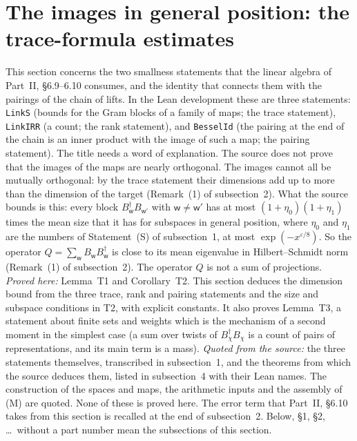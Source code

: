 \documentclass[11pt,letterpaper]{article}
\begin{document}
\section{The images in general position: the trace-formula estimates}\label{tr:sec}

This section concerns the two smallness statements that the linear algebra of Part~II, \S6.9--6.10 consumes,
and the identity that connects them with the pairings of the chain of lifts. In the Lean development these
are three statements: \texttt{LinkS} (bounds for the Gram blocks of a family of maps; the trace statement),
\texttt{LinkIRR} (a count; the rank statement), and \texttt{BesselId} (the pairing at the end of the chain is
an inner product with the image of such a map; the pairing statement). The title needs a word of
explanation. The source does not prove that the images of the maps are nearly orthogonal. The images cannot
all be mutually orthogonal: by the trace statement their dimensions add up to more than the dimension of the
target (Remark~(1) of subsection~2). What the source bounds is this: every block
$B_{\mathsf w}^\dagger B_{\mathsf w'}$ with $\mathsf w\ne\mathsf w'$ has at most $(1+\eta_0)(1+\eta_1)$ times
the mean size that it has for subspaces in general position, where $\eta_0$ and $\eta_1$ are the numbers
of Statement~(S) of subsection~1, at most $\exp(-x^{\varepsilon/8})$. So the operator
$Q=\sum_{\mathsf w}B_{\mathsf w}B_{\mathsf w}^\dagger$ is close to its mean eigenvalue in Hilbert--Schmidt norm
(Remark~(1) of subsection~2). The operator $Q$ is not a sum of projections. \emph{Proved here:} Lemma~T1 and
Corollary~T2. This section deduces the dimension bound from the three trace, rank and pairing statements and
the size and subspace conditions in T2, with explicit constants. It also proves Lemma~T3, a statement about
finite sets and weights which is the mechanism of a second moment in the simplest case (a sum over twists of
$B_\chi^\dagger B_\chi$ is a count of pairs of representations, and its main term is a mass). \emph{Quoted
from the source:} the three statements themselves, transcribed in subsection~1, and the theorems from which
the source deduces them, listed in subsection~4 with their Lean names. The construction of the spaces and
maps, the arithmetic inputs and the assembly of (M) are quoted. None of these is proved here. The error term
that Part~II, \S6.10 takes from this section is recalled at the end of subsection~2. Below, \S1, \S2, \dots\
without a part number mean the subsections of this section.
\end{document}
